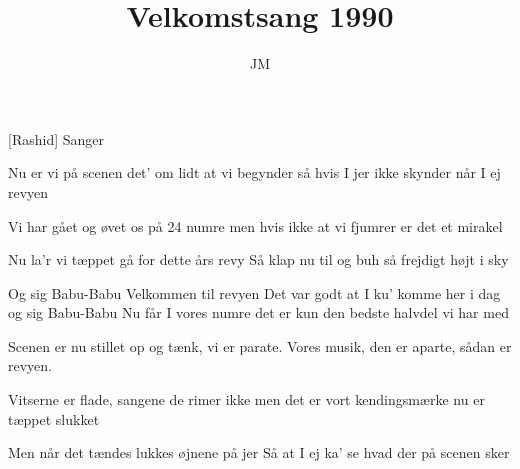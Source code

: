 \documentclass[a4paper,11pt]{article}
\title{Velkomstsang 1990}
\author{JM}
\begin{document}
\maketitle

\begin{roles}
[Rashid] Sanger 
\end{roles}

\begin{song}
   Nu er vi på scenen
            det' om lidt at vi begynder
            så hvis I jer ikke skynder
            når I ej revyen

   Vi har gået og øvet os
            på 24 numre
            men hvis ikke at vi fjumrer
            er det et mirakel

   Nu la'r vi tæppet gå for dette års revy
            Så klap nu til og buh så frejdigt højt i sky

   Og sig Babu-Babu
            Velkommen til revyen
            Det var godt at I ku' komme her i dag
            og sig Babu-Babu
            Nu får I vores numre
            det er kun den bedste halvdel vi har med

   Scenen er nu stillet op
            og tænk, vi er parate.
            Vores musik, den er aparte,
            sådan er revyen.

   Vitserne er flade,
            sangene de rimer ikke
            men det er vort kendingsmærke
            nu er tæppet slukket

   Men når det tændes lukkes øjnene på jer
            Så at I ej ka' se hvad der på scenen sker

\end{song}
\end{document}
